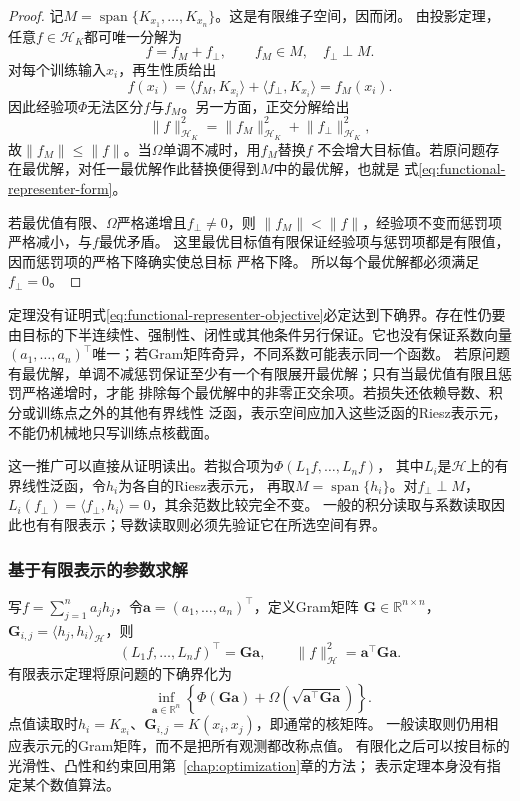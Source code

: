 \begin{proof}
记$M=\operatorname{span}\{K_{x_1},\ldots,K_{x_n}\}$。这是有限维子空间，因而闭。
由投影定理，任意$f\in\mathcal{H}_K$都可唯一分解为
\[
  f=f_M+f_{\perp},\qquad f_M\in M,\quad f_{\perp}\perp M.
\]
对每个训练输入$x_i$，再生性质给出
\[
  f(x_i)
  =
  \langle f_M,K_{x_i}\rangle
  +
  \langle f_{\perp},K_{x_i}\rangle
  =
  f_M(x_i).
\]
因此经验项$\Phi$无法区分$f$与$f_M$。另一方面，正交分解给出
\[
  \lVert f\rVert_{\mathcal{H}_K}^2
  =
  \lVert f_M\rVert_{\mathcal{H}_K}^2
  +
  \lVert f_{\perp}\rVert_{\mathcal{H}_K}^2,
\]
故$\lVert f_M\rVert\leq\lVert f\rVert$。当$\Omega$单调不减时，用$f_M$替换$f$
不会增大目标值。若原问题存在最优解，对任一最优解作此替换便得到$M$中的最优解，也就是
式\eqref{eq:functional-representer-form}。

若最优值有限、$\Omega$严格递增且$f_{\perp}\neq0$，则
$\lVert f_M\rVert<\lVert f\rVert$，经验项不变而惩罚项严格减小，与$f$最优矛盾。
这里最优目标值有限保证经验项与惩罚项都是有限值，因而惩罚项的严格下降确实使总目标
严格下降。
所以每个最优解都必须满足$f_{\perp}=0$。
\end{proof}

定理没有证明式\eqref{eq:functional-representer-objective}必定达到下确界。存在性仍要
由目标的下半连续性、强制性、闭性或其他条件另行保证。它也没有保证系数向量
$(a_1,\ldots,a_n)^{\top}$唯一；若Gram矩阵奇异，不同系数可能表示同一个函数。
若原问题有最优解，单调不减惩罚保证至少有一个有限展开最优解；只有当最优值有限且惩罚严格递增时，才能
排除每个最优解中的非零正交余项。若损失还依赖导数、积分或训练点之外的其他有界线性
泛函，表示空间应加入这些泛函的Riesz表示元，不能仍机械地只写训练点核截面。

这一推广可以直接从证明读出。若拟合项为$\Phi(L_1f,\ldots,L_nf)$，
其中$L_i$是$\mathcal H$上的有界线性泛函，令$h_i$为各自的Riesz表示元，
再取$M=\operatorname{span}\{h_i\}$。对$f_\perp\perp M$，
$L_i(f_\perp)=\langle f_\perp,h_i\rangle=0$，其余范数比较完全不变。
一般的积分读取与系数读取因此也有有限表示；导数读取则必须先验证它在所选空间有界。

\subsubsection{基于有限表示的参数求解}
\label{sec:functional-finite-parameter-solvers}

写$f=\sum_{j=1}^n a_jh_j$，令$\bm a=(a_1,\ldots,a_n)^\top$，定义Gram矩阵
$\bm G\in\mathbb R^{n\times n}$，$\bm G_{i,j}=\langle h_j,h_i\rangle_{\mathcal H}$，则
\[
 (L_1f,\ldots,L_nf)^\top=\bm G\bm a,\qquad
 \lVert f\rVert_{\mathcal H}^2=\bm a^\top\bm G\bm a.
\]
有限表示定理将原问题的下确界化为
\begin{equation}
 \inf_{\bm a\in\mathbb R^n}
 \left\{\Phi(\bm G\bm a)
       +\Omega\!\left(\sqrt{\bm a^\top\bm G\bm a}\right)\right\}.
 \label{eq:functional-finite-gram-objective}
\end{equation}
点值读取时$h_i=K_{x_i}$、$\bm G_{i,j}=K(x_i,x_j)$，即通常的核矩阵。
一般读取则仍用相应表示元的Gram矩阵，而不是把所有观测都改称点值。
有限化之后可以按目标的光滑性、凸性和约束回用第~\ref{chap:optimization}章的方法；
表示定理本身没有指定某个数值算法。

